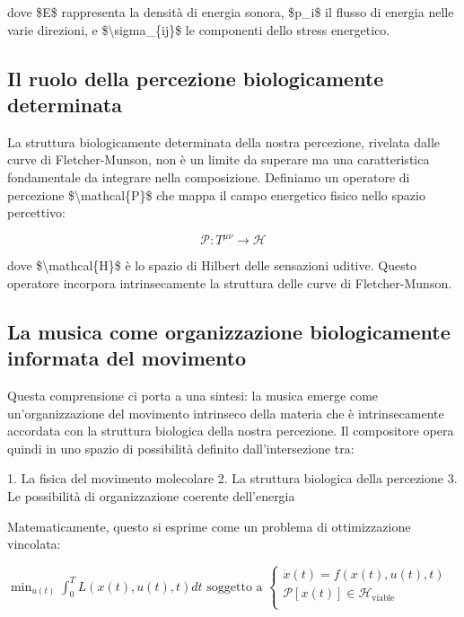 \documentclass[a4paper,11pt]{article}
\begin{document}
dove \$E\$ rappresenta la densità di energia sonora, \$p\_i\$ il flusso di
energia nelle varie direzioni, e \$\textbackslash{}sigma\_\{ij\}\$ le componenti dello
stress energetico.

\subsection{Il ruolo della percezione biologicamente determinata}\hypertarget{il-ruolo-della-percezione-biologicamente-determinata}{}\label{il-ruolo-della-percezione-biologicamente-determinata}

La struttura biologicamente determinata della nostra percezione,
rivelata dalle curve di Fletcher-Munson, non è un limite da superare ma
una caratteristica fondamentale da integrare nella composizione.
Definiamo un operatore di percezione \$\textbackslash{}mathcal\{P\}\$ che mappa il campo
energetico fisico nello spazio percettivo:

\begin{displaymath}
\mathcal{P}: T^{\mu\nu} \rightarrow \mathcal{H}
\end{displaymath}

dove \$\textbackslash{}mathcal\{H\}\$ è lo spazio di Hilbert delle sensazioni uditive.
Questo operatore incorpora intrinsecamente la struttura delle curve di
Fletcher-Munson.

\subsection{La musica come organizzazione biologicamente informata del movimento}\hypertarget{la-musica-come-organizzazione-biologicamente-informata-del-movimento}{}\label{la-musica-come-organizzazione-biologicamente-informata-del-movimento}

Questa comprensione ci porta a una sintesi: la musica emerge come
un'organizzazione del movimento intrinseco della materia che è
intrinsecamente accordata con la struttura biologica della nostra
percezione. Il compositore opera quindi in uno spazio di possibilità
definito dall'intersezione tra:

1. La fisica del movimento molecolare 2. La struttura biologica della
percezione 3. Le possibilità di organizzazione coerente dell'energia

Matematicamente, questo si esprime come un problema di ottimizzazione
vincolata:

$\min_{u(t)} \int_0^T L(x(t), u(t), t)dt$
$\text{soggetto a } \begin{cases}
\dot{x}(t) = f(x(t), u(t), t) \\
\mathcal{P}[x(t)] \in \mathcal{H}_{\text{viable}} \\
\end{cases}$
\end{document}
